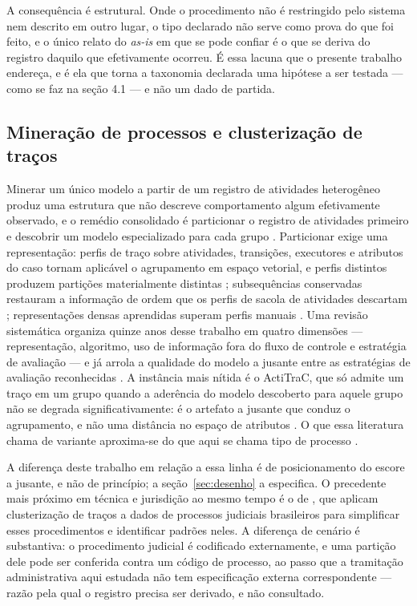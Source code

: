 A consequência é estrutural. Onde o procedimento não é restringido pelo sistema nem descrito em
outro lugar, o tipo declarado não serve como prova do que foi feito, e o único relato do
\emph{as-is} em que se pode confiar é o que se deriva do registro daquilo que efetivamente
ocorreu. É essa lacuna que o presente trabalho endereça, e é ela que torna a taxonomia declarada
uma hipótese a ser testada --- como se faz na seção 4.1 --- e não um dado de partida.

\subsection{Mineração de processos e clusterização de traços}
\label{sec:rev-clustering}

Minerar um único modelo a partir de um registro de atividades heterogêneo produz uma estrutura que não descreve
comportamento algum efetivamente observado, e o remédio consolidado é particionar o registro de atividades primeiro e
descobrir um modelo especializado para cada grupo \cite{greco2006clustering}. Particionar exige uma
representação: perfis de traço sobre atividades, transições, executores e atributos do caso tornam
aplicável o agrupamento em espaço vetorial, e perfis distintos produzem partições materialmente
distintas \cite{song2009trace}; subsequências conservadas restauram a informação de ordem que os
perfis de sacola de atividades descartam \cite{bose2009context}; representações densas aprendidas
superam perfis manuais \cite{dekoninck2018act2vec}. Uma revisão sistemática organiza quinze anos
desse trabalho em quatro dimensões --- representação, algoritmo, uso de informação fora do fluxo de
controle e estratégia de avaliação --- e já arrola a qualidade do modelo a jusante entre as
estratégias de avaliação reconhecidas \cite{zandkarimi2020generic}. A instância mais nítida é o
ActiTraC, que só admite um traço em um grupo quando a aderência do modelo descoberto para aquele
grupo não se degrada significativamente: é o artefato a jusante que conduz o agrupamento, e não uma
distância no espaço de atributos \cite{deweerdt2013actitrac}. O que essa literatura chama de
variante aproxima-se do que aqui se chama tipo de processo \cite{taymouri2021variant}.

A diferença deste trabalho em relação a essa linha é de posicionamento do escore a jusante, e não de
princípio; a seção~\ref{sec:desenho} a especifica. O precedente mais próximo em técnica e jurisdição ao mesmo
tempo é o de
, que aplicam clusterização de traços a dados de processos judiciais
brasileiros para simplificar esses procedimentos e identificar padrões neles. A diferença de cenário é
substantiva: o procedimento judicial é codificado externamente, e uma partição dele pode ser
conferida contra um código de processo, ao passo que a tramitação administrativa aqui estudada não
tem especificação externa correspondente --- razão pela qual o registro precisa ser derivado, e não
consultado.

